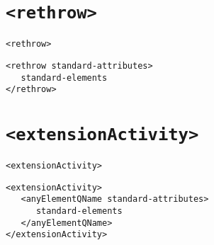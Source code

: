 \section{\texttt{<rethrow>}}
\texttt{<rethrow>}
\begin{verbatim}
<rethrow standard-attributes>
   standard-elements
</rethrow>
\end{verbatim}

\section{\texttt{<extensionActivity>}}
\texttt{<extensionActivity>}
\begin{verbatim}
<extensionActivity>
   <anyElementQName standard-attributes>
      standard-elements
   </anyElementQName>
</extensionActivity>
\end{verbatim}

